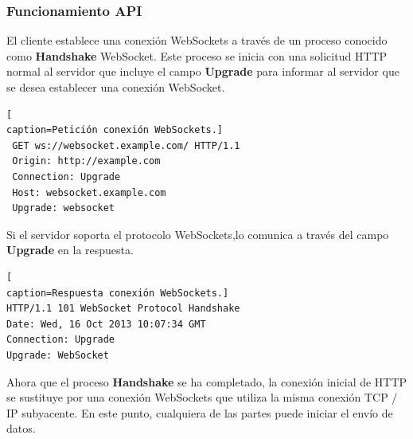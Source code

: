 \subsubsection*{Funcionamiento API}
El cliente establece una conexión WebSockets\cite{WebSocketEjemplo} a través de un proceso conocido como \textbf{Handshake} WebSocket. Este proceso se inicia con una solicitud HTTP normal al servidor que incluye el campo \textbf{Upgrade} para informar al servidor que se desea establecer una conexión WebSocket.
\begin{lstlisting}[
caption=Petición conexión WebSockets.]
 GET ws://websocket.example.com/ HTTP/1.1
 Origin: http://example.com
 Connection: Upgrade
 Host: websocket.example.com
 Upgrade: websocket
\end{lstlisting}
Si el servidor soporta el protocolo WebSockets,lo comunica a través del campo \textbf{Upgrade} en la respuesta.
\begin{lstlisting}[
caption=Respuesta conexión WebSockets.]
HTTP/1.1 101 WebSocket Protocol Handshake
Date: Wed, 16 Oct 2013 10:07:34 GMT
Connection: Upgrade
Upgrade: WebSocket
\end{lstlisting}
Ahora que el proceso \textbf{Handshake} se ha completado, la conexión inicial de HTTP se sustituye por una conexión WebSockets que utiliza la misma conexión TCP / IP subyacente. En este punto, cualquiera de las partes puede iniciar el envío de datos.
